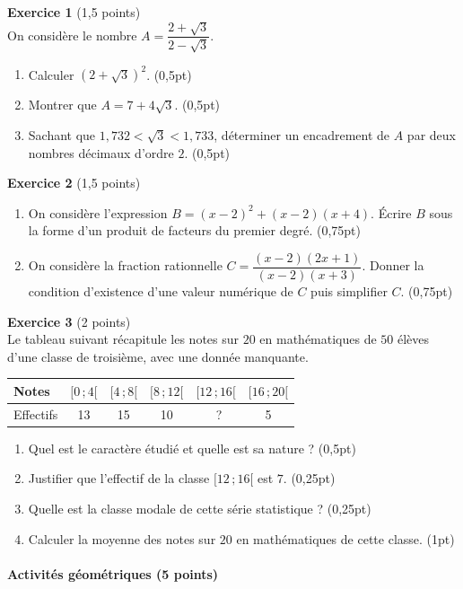 \textbf{Exercice 1} (1,5 points) \\
On considère le nombre $A=\dfrac{2+\sqrt3}{2-\sqrt3}$.
\begin{enumerate}[label=\arabic*)]
\item Calculer $(2+\sqrt3)^{2}$. \hfill (0,5pt)
\item Montrer que $A=7+4\sqrt3$. \hfill (0,5pt)
\item Sachant que $1{,}732<\sqrt3<1{,}733$, déterminer un encadrement de $A$ par deux
nombres décimaux d'ordre $2$. \hfill (0,5pt)
\end{enumerate}

\textbf{Exercice 2} (1,5 points)
\begin{enumerate}[label=\arabic*)]
\item On considère l'expression $B=(x-2)^{2}+(x-2)(x+4)$. Écrire $B$ sous la forme d'un
produit de facteurs du premier degré. \hfill (0,75pt)
\item On considère la fraction rationnelle $C=\dfrac{(x-2)(2x+1)}{(x-2)(x+3)}$. Donner la
condition d'existence d'une valeur numérique de $C$ puis simplifier $C$. \hfill (0,75pt)
\end{enumerate}

\textbf{Exercice 3} (2 points) \\
Le tableau suivant récapitule les notes sur $20$ en mathématiques de $50$ élèves d'une
classe de troisième, avec une donnée manquante.
\begin{center}
\small
\begin{tabular}{lccccc}
\toprule
Notes & $[0\,;4[$ & $[4\,;8[$ & $[8\,;12[$ & $[12\,;16[$ & $[16\,;20[$ \\
\midrule
Effectifs & 13 & 15 & 10 & \ ? & 5 \\
\bottomrule
\end{tabular}
\end{center}
\begin{enumerate}[label=\arabic*)]
\item Quel est le caractère étudié et quelle est sa nature ? \hfill (0,5pt)
\item Justifier que l'effectif de la classe $[12\,;16[$ est $7$. \hfill (0,25pt)
\item Quelle est la classe modale de cette série statistique ? \hfill (0,25pt)
\item Calculer la moyenne des notes sur $20$ en mathématiques de cette classe. \hfill (1pt)
\end{enumerate}

\paragraph{Activités géométriques (5 points)}

